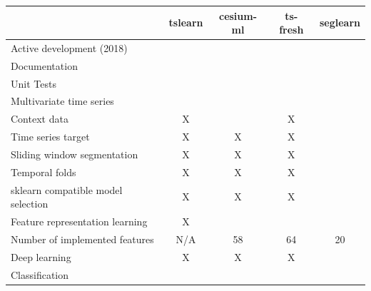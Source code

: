 \documentclass[twoside,11pt]{article}
\newcommand{\greencheck}{{\color{green}\checkmark}}
\newcommand{\redx}{{\color{red}X}}
\begin{document}
\begin{table}[]
	\centering
	\begin{tabular}{lcccc}
		\toprule
		& \textbf{tslearn} & \textbf{cesium-ml} & \textbf{ts-fresh} & \textbf{seglearn} \\ \midrule
		Active development (2018)          & \greencheck              & \greencheck                & \greencheck               & \greencheck               \\
		Documentation                      & \greencheck              & \greencheck                & \greencheck               & \greencheck               \\
		Unit Tests                         & \greencheck              & \greencheck                & \greencheck               & \greencheck               \\
		Multivariate time series           & \greencheck              & \greencheck                & \greencheck               & \greencheck               \\
		Context data                       & \redx               & \greencheck                & \redx                & \greencheck               \\
		Time series target                 & \redx               & \redx                 & \redx                & \greencheck               \\
		Sliding window segmentation        & \redx               & \redx                 & \redx                & \greencheck               \\
		Temporal folds                     & \redx               & \redx                 & \redx                & \greencheck               \\
		sklearn compatible model selection & \redx               & \redx                 & \redx                & \greencheck               \\
		Feature representation learning    & \redx               & \greencheck                & \greencheck               & \greencheck               \\
		Number of implemented features     & N/A              & 58                 & 64                & 20                \\
		Deep learning                      & \redx               & \redx                 & \redx                & \greencheck               \\
		Classification                     & \greencheck              & \greencheck                & \greencheck               & \greencheck               \\

\end{tabular}
\end{table}
\end{document}
